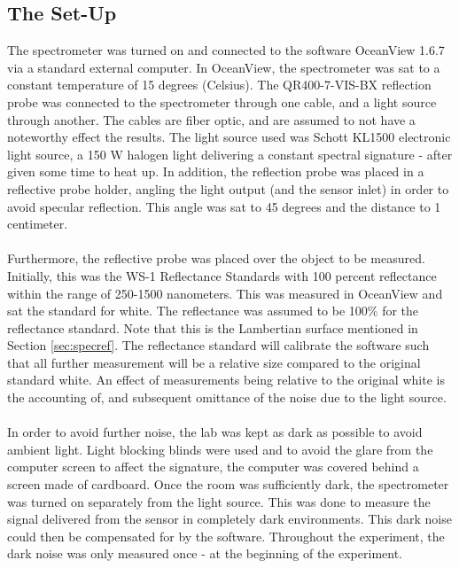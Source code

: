 \subsection{The Set-Up}
The spectrometer was turned on and connected to the software OceanView 1.6.7 via a standard external computer. In OceanView, the spectrometer was sat to a constant temperature of 15 degrees (Celsius). The QR400-7-VIS-BX reflection probe was connected to the spectrometer through one cable, and a light source through another. The cables are fiber optic, and are assumed to not have a noteworthy effect the results. The light source used was Schott KL1500 electronic light source, a 150 W halogen light delivering a constant spectral signature - after given some time to heat up. In addition, the reflection probe was placed in a reflective probe holder, angling the light output (and the sensor inlet) in order to avoid specular reflection. This angle was sat to 45 degrees and the distance to 1 centimeter.
\\\\
Furthermore, the reflective probe was placed over the object to be measured. Initially, this was the WS-1 Reflectance Standards with 100 percent reflectance within the range of 250-1500 nanometers. This was measured in OceanView and sat the standard for white. The reflectance was assumed to be 100\% for the reflectance standard. Note that this is the Lambertian surface mentioned in Section \ref{sec:specref}. The reflectance standard will calibrate the software such that all further measurement will be a relative size compared to the original standard white. An effect of measurements being relative to the original white is the accounting of, and subsequent omittance of the noise due to the light source. 
\\\\
In order to avoid further noise, the lab was kept as dark as possible to avoid ambient light. Light blocking blinds were used and to avoid the glare from the computer screen to affect the signature, the computer was covered behind a screen made of cardboard. Once the room was sufficiently dark, the spectrometer was turned on separately from the light source. This was done to measure the signal delivered from the sensor in completely dark environments. This dark noise could then be compensated for by the software. Throughout the experiment, the dark noise was only measured once - at the beginning of the experiment.
\\\\

